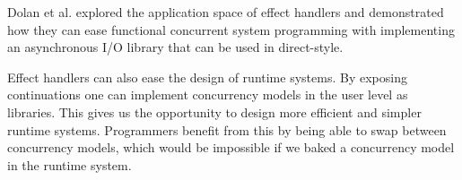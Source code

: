\documentclass[class=article,crop=false,11pt]{standalone}
\begin{document}
Dolan et al. \cite{dolan2017concurrent} explored the application space of effect handlers and 
demonstrated how they can ease functional concurrent system programming with implementing an asynchronous I/O 
library that can be used in direct-style.

Effect handlers can also ease the design of runtime systems. By exposing continuations one
can implement concurrency models in the user level as libraries. This gives us the opportunity
to design more efficient and simpler runtime systems. Programmers benefit from this by
being able to swap between concurrency models, which would be impossible if we baked a
concurrency model in the runtime system.

\ifstandalone
{}

\fi
\end{document}
